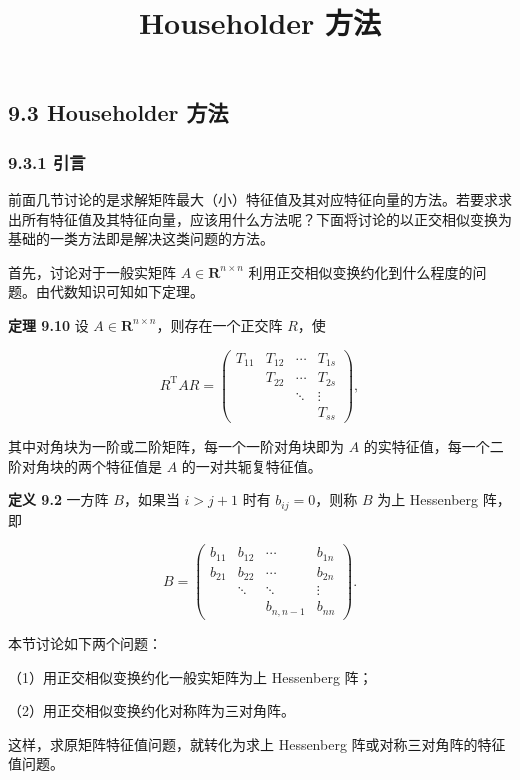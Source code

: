 \documentclass[
  10pt,
  fontset=fandol]{ctexart}
\title{Householder 方法}
\author{}
\date{}
\begin{document}
\maketitle

\subsection{9.3 Householder 方法}\label{householder-ux65b9ux6cd5}

\subsubsection{9.3.1 引言}\label{ux5f15ux8a00}

前面几节讨论的是求解矩阵最大（小）特征值及其对应特征向量的方法。若要求求出所有特征值及其特征向量，应该用什么方法呢？下面将讨论的以正交相似变换为基础的一类方法即是解决这类问题的方法。

首先，讨论对于一般实矩阵 \(A\in\mathbf R^{n\times n}\) 利用正交相似变换约化到什么程度的问题。由代数知识可知如下定理。

\textbf{定理 9.10} 设 \(A\in\mathbf R^{n\times n}\)，则存在一个正交阵 \(R\)，使

\[
R^{\mathrm T}AR=\begin{pmatrix}
T_{11}&T_{12}&\cdots&T_{1s}\\
&T_{22}&\cdots&T_{2s}\\
&&\ddots&\vdots\\
&&&T_{ss}
\end{pmatrix},
\]

其中对角块为一阶或二阶矩阵，每一个一阶对角块即为 \(A\) 的实特征值，每一个二阶对角块的两个特征值是 \(A\) 的一对共轭复特征值。

\textbf{定义 9.2} 一方阵 \(B\)，如果当 \(i>j+1\) 时有 \(b_{ij}=0\)，则称 \(B\) 为上 Hessenberg 阵，即

\[
B=\begin{pmatrix}
b_{11}&b_{12}&\cdots&b_{1n}\\
b_{21}&b_{22}&\cdots&b_{2n}\\
&\ddots&\ddots&\vdots\\
&&b_{n,n-1}&b_{nn}
\end{pmatrix}.
\]

本节讨论如下两个问题：

（1）用正交相似变换约化一般实矩阵为上 Hessenberg 阵；

（2）用正交相似变换约化对称阵为三对角阵。

这样，求原矩阵特征值问题，就转化为求上 Hessenberg 阵或对称三对角阵的特征值问题。
\end{document}
